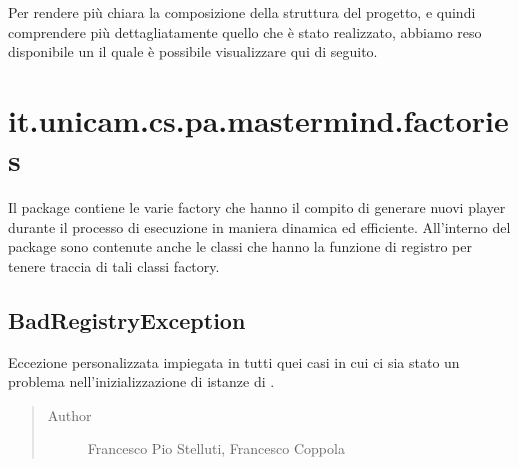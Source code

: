 \documentclass[letterpaper,10pt,italian,openany,oneside]{sphinxmanual}
\begin{document}
Per rendere più chiara la composizione della struttura del progetto, e quindi comprendere più dettagliatamente quello
che è stato realizzato, abbiamo reso disponibile un  il quale è possibile visualizzare qui di seguito.

\noindent{}


\section{it.unicam.cs.pa.mastermind.factories}
\label{\detokenize{source/it/unicam/cs/pa/mastermind/factories/package-index:it-unicam-cs-pa-mastermind-factories}}\label{\detokenize{source/it/unicam/cs/pa/mastermind/factories/package-index::doc}}
Il package contiene le varie factory che hanno il compito di generare nuovi player durante il processo di esecuzione in maniera dinamica ed efficiente. All’interno del package sono contenute anche le classi che hanno la funzione di registro per tenere traccia di tali classi factory.

\label{\detokenize{source/it/unicam/cs/pa/mastermind/factories/package-index:package-it.unicam.cs.pa.mastermind.factories}}

\subsection{BadRegistryException}
\label{\detokenize{source/it/unicam/cs/pa/mastermind/factories/BadRegistryException:badregistryexception}}\label{\detokenize{source/it/unicam/cs/pa/mastermind/factories/BadRegistryException::doc}}

\begin{fulllineitems}
\label{\detokenize{source/it/unicam/cs/pa/mastermind/factories/BadRegistryException:it.unicam.cs.pa.mastermind.factories.BadRegistryException}}
Eccezione personalizzata impiegata in tutti quei casi in cui ci sia stato un problema nell’inizializzazione di istanze di .
\begin{quote}\begin{description}
\item[{Author}] \leavevmode
Francesco Pio Stelluti, Francesco Coppola

\end{description}\end{quote}

\end{fulllineitems}
\end{document}
